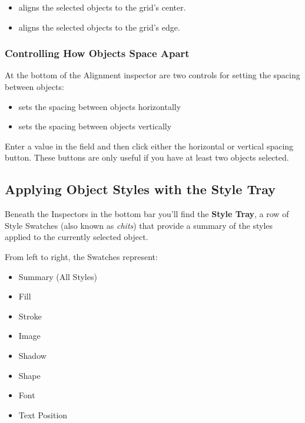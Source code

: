 \documentclass[../main.tex]{subfiles}
\begin{document}
\begin{itemize}
  \item {} aligns the selected objects to the
    grid's center.
  \item {} aligns the selected objects to the
    grid's edge.
\end{itemize}

\subsubsection{Controlling How Objects Space Apart}

At the bottom of the Alignment inspector are two controls for setting the spacing between
objects:

\begin{itemize}
  \item {} sets the spacing between objects
    horizontally
  \item {} sets the spacing between objects
    vertically
\end{itemize}

Enter a value in the field and then click either the horizontal or vertical spacing button.
These buttons are only useful if you have at least two objects selected.

\subsection{Applying Object Styles with the Style Tray}

Beneath the Inspectors in the bottom bar you'll find the \textbf{Style Tray}, a row of Style
Swatches (also known as \textit{chits}) that provide a summary of the styles applied to the
currently selected object.


From left to right, the Swatches represent:

\begin{itemize}
  \item Summary (All Styles)
  \item Fill
  \item Stroke
  \item Image
  \item Shadow
  \item Shape
  \item Font
  \item Text Position
\end{itemize}
\end{document}
